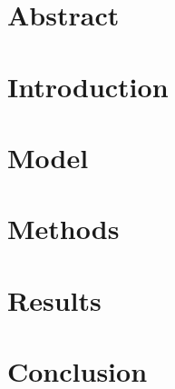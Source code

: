 \documentclass[a4paper,headsepline,bibtotocnumbered,12pt,titlepage,twoside]{scrartcl}
\numberwithin{equation}{section}
\numberwithin{figure}{section}
\numberwithin{table}{section}
\begin{document}
    \tableofcontents
    \newpage
    \listoffigures
    \listoftables

    \section{Abstract}
        

    \section{Introduction}
        

    \section{Model}
        

    \section{Methods}
        

    \section{Results}
        

    \section{Conclusion}
        

    \clearpage
    \pagestyle{empty}
    

    \clearpage
    
    
\end{document}
